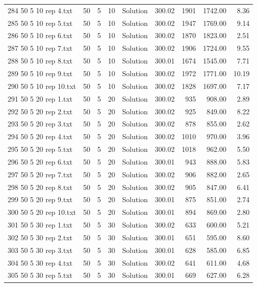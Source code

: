 \begin{longtable}{lrrllrrrr}
284 50 5 10 rep 4.txt & 50 & 5 & 10 & Solution & 300.02 & 1901 & 1742.00 &  8.36\\
285 50 5 10 rep 5.txt & 50 & 5 & 10 & Solution & 300.02 & 1947 & 1769.00 &  9.14\\
286 50 5 10 rep 6.txt & 50 & 5 & 10 & Solution & 300.02 & 1870 & 1823.00 &  2.51\\
287 50 5 10 rep 7.txt & 50 & 5 & 10 & Solution & 300.02 & 1906 & 1724.00 &  9.55\\
288 50 5 10 rep 8.txt & 50 & 5 & 10 & Solution & 300.01 & 1674 & 1545.00 &  7.71\\
289 50 5 10 rep 9.txt & 50 & 5 & 10 & Solution & 300.02 & 1972 & 1771.00 & 10.19\\
290 50 5 10 rep 10.txt & 50 & 5 & 10 & Solution & 300.02 & 1828 & 1697.00 &  7.17\\
291 50 5 20 rep 1.txt & 50 & 5 & 20 & Solution & 300.02 & 935 & 908.00 &  2.89\\
292 50 5 20 rep 2.txt & 50 & 5 & 20 & Solution & 300.02 & 925 & 849.00 &  8.22\\
293 50 5 20 rep 3.txt & 50 & 5 & 20 & Solution & 300.02 & 878 & 855.00 &  2.62\\
294 50 5 20 rep 4.txt & 50 & 5 & 20 & Solution & 300.02 & 1010 & 970.00 &  3.96\\
295 50 5 20 rep 5.txt & 50 & 5 & 20 & Solution & 300.02 & 1018 & 962.00 &  5.50\\
296 50 5 20 rep 6.txt & 50 & 5 & 20 & Solution & 300.01 & 943 & 888.00 &  5.83\\
297 50 5 20 rep 7.txt & 50 & 5 & 20 & Solution & 300.02 & 906 & 882.00 &  2.65\\
298 50 5 20 rep 8.txt & 50 & 5 & 20 & Solution & 300.02 & 905 & 847.00 &  6.41\\
299 50 5 20 rep 9.txt & 50 & 5 & 20 & Solution & 300.01 & 875 & 851.00 &  2.74\\
300 50 5 20 rep 10.txt & 50 & 5 & 20 & Solution & 300.01 & 894 & 869.00 &  2.80\\
301 50 5 30 rep 1.txt & 50 & 5 & 30 & Solution & 300.02 & 633 & 600.00 &  5.21\\
302 50 5 30 rep 2.txt & 50 & 5 & 30 & Solution & 300.01 & 651 & 595.00 &  8.60\\
303 50 5 30 rep 3.txt & 50 & 5 & 30 & Solution & 300.01 & 628 & 585.00 &  6.85\\
304 50 5 30 rep 4.txt & 50 & 5 & 30 & Solution & 300.02 & 641 & 611.00 &  4.68\\
305 50 5 30 rep 5.txt & 50 & 5 & 30 & Solution & 300.01 & 669 & 627.00 &  6.28\\

\end{longtable}
